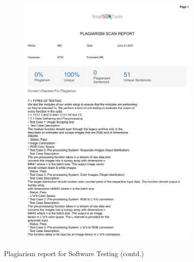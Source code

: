 \documentclass[oneside,a4paper,12pt]{report}
\begin{document}
\begin{appendices}
\begin{figure}
\begin{subfigure}[H]{\textwidth}
    	\includegraphics[scale=0.7, page=3]{plagiarism/software_testing.pdf}
    \end{subfigure}
    \caption{Plagiarism report for Software Testing (contd.)}
    \label{PlagiarismSoftwareTesting_2}
\end{figure}



\end{appendices}
\end{document}

